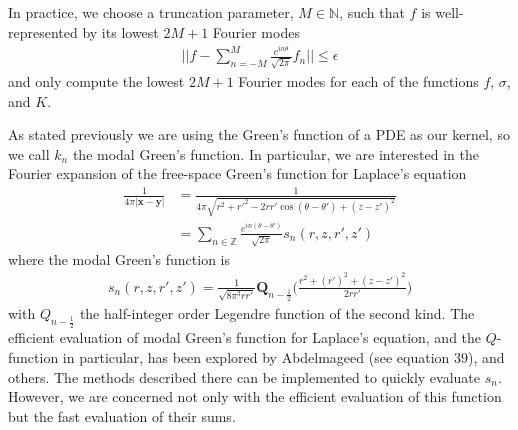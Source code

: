 \documentclass[11pt, oneside]{article}   	%
\begin{document}
In practice, we choose a truncation parameter, $M\in\mathbb{N}$, such that $f$ is well-represented by its lowest $2M+1$ Fourier modes
\begin{align}
||f-\sum\limits_{n=-M}^{M}\frac{e^{in\theta}}{\sqrt{2\pi}}f_n||\le\epsilon
\end{align}
and only compute the lowest $2M+1$ Fourier modes for each of the functions $f$, $\sigma$, and $K$.

As stated previously we are using the Green's function of a PDE as our kernel, so we call $k_n$ the modal Green's function. In particular, we are interested in the Fourier expansion of the free-space Green's function for Laplace's equation
\begin{align}
\frac{1}{4\pi |\mathbf{x}-\mathbf{y}|} &=\frac{1}{4\pi\sqrt{r^2+r'^2-2rr'\cos{(\theta-\theta')}+(z-z')^2}}\\
&= \sum_{n\in\mathbb{Z}} \frac{e^{in(\theta-\theta')}}{\sqrt{2\pi}} s_n(r,z,r',z')
\end{align}
where the modal Green's function is
\begin{align}
s_n(r,z,r',z')=\frac{1}{\sqrt{8\pi^3 rr'}}\mathbf{Q}_{n-\frac{1}{2}}\bigg(\frac{r^2+(r')^2+(z-z')^2}{2rr'}\bigg)
\end{align}
with $Q_{n-\frac{1}{2}}$ the half-integer order Legendre function of the second kind. The efficient evaluation of modal Green's function for Laplace's equation, and the $Q$-function in particular, has been explored by Abdelmageed (see equation $39$), and others. The methods described there can be implemented to quickly evaluate $s_n$. However, we are concerned not only with the efficient evaluation of this function but the fast evaluation of their sums.
\end{document}
